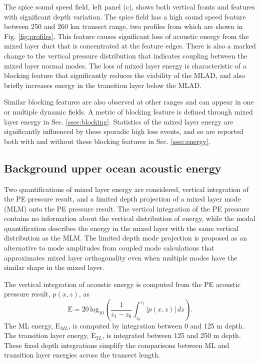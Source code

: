 \documentclass[preprint,NumberedRefs]{JASA}
\begin{document}
The spice sound speed field, left panel (c), shows both vertical fronts and features with significant depth variation. The spice field has a high sound speed feature between 250 and 260 km transect range, two profiles from which are shown in Fig. \ref{fig:profiles}. This feature causes significant loss of acoustic energy from the mixed layer duct that is concentrated at the feature edges. There is also a marked change to the vertical pressure distribution that indicates coupling between the mixed layer normal modes. The loss of mixed layer energy is characteristic of a blocking feature that significantly reduces the viability of the MLAD, and also briefly increases energy in the transition layer below the MLAD.

Similar blocking features are also observed at other ranges and can appear in one or multiple dynamic fields. A metric of blocking feature is defined through mixed layer energy in Sec. \ref{ssec:blocking}. Statistics of the mixed layer energy are significantly influenced by these sporadic high loss events, and so are reported both with and without these blocking features in Sec. \ref{ssec:energy}.

\subsection{Background upper ocean acoustic energy}\label{ssec:bg}
Two quantifications of mixed layer energy are considered, vertical integration of the PE pressure result, and a limited depth projection of a mixed layer mode (MLM) onto the PE pressure result. The vertical integration of the PE pressure contains no information about the vertical distribution of energy, while the modal quantification describes the energy in the mixed layer with the same vertical distribution as the MLM. The limited depth mode projection is proposed as an alternative to mode amplitudes from coupled mode calculations that approximates mixed layer orthogonality even when multiple modes have the similar shape in the mixed layer.

The vertical integration of acoustic energy is computed from the PE acoustic pressure result, $p(x, z)$, as
\begin{equation}
        \textrm{E} = 20 \, \textrm{log}_{10} \left( \frac{1}{z_1 - z_0} \int^{z_1}_{z_0} \left| p(x, z) \right| \,  dz \right).
    \label{eq:int_eng}
\end{equation}
The ML energy, $\textrm{E}_{ML}$, is computed by integration between 0 and 125 m depth. The transition layer energy, $\textrm{E}_{TL}$, is integrated between 125 and 250 m depth. These fixed depth integrations simplify the comparisons between ML and transition layer energies across the transect length.
\end{document}
